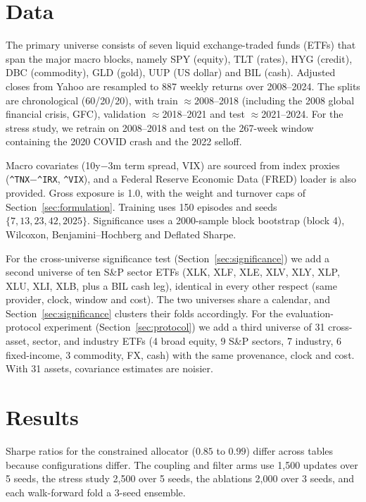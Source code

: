 \documentclass[sigconf]{acmart}
\begin{document}
\section{Data}
\label{sec:data}

The primary universe consists of seven liquid exchange-traded funds (ETFs) that span the major macro blocks, namely SPY (equity), TLT (rates), HYG (credit), DBC (commodity), GLD (gold), UUP
(US dollar) and BIL (cash). Adjusted closes from Yahoo are resampled to 887 weekly returns over
2008--2024. The splits are chronological (60/20/20), with train $\approx$2008--2018 (including the 2008 global financial crisis, GFC), validation $\approx$2018--2021 and test $\approx$2021--2024.
For the stress study, we retrain on 2008--2018 and test on the 267-week window containing the
2020 COVID crash and the 2022 selloff.

Macro covariates (10y$-$3m term spread, VIX) are sourced from index proxies
(\texttt{\^{}TNX$-$\^{}IRX}, \texttt{\^{}VIX}), and a Federal Reserve Economic Data (FRED) loader
is also provided. Gross exposure is 1.0, with the weight and turnover caps of Section~\ref{sec:formulation}. Training uses 150 episodes and seeds $\{7,13,23,42,2025\}$.
Significance uses a 2000-sample block bootstrap (block 4), Wilcoxon, Benjamini--Hochberg and
Deflated Sharpe.

For the cross-universe significance test (Section~\ref{sec:significance}) we add a
second universe of ten S\&P sector ETFs (XLK, XLF, XLE, XLV, XLY, XLP, XLU, XLI, XLB,
plus a BIL cash leg), identical in every other respect (same provider, clock, window
and cost). The two universes share a calendar, and
Section~\ref{sec:significance} clusters their folds accordingly. For the evaluation-protocol
experiment (Section~\ref{sec:protocol}) we add a third universe of 31
cross-asset, sector, and industry ETFs (4 broad equity, 9 S\&P sectors, 7 industry,
6 fixed-income, 3 commodity, FX, cash) with the same provenance, clock and cost. With 31
assets, covariance estimates are noisier.

\section{Results}
\label{sec:results}

Sharpe ratios for the constrained allocator ($0.85$ to $0.99$) differ across tables because configurations differ. The coupling and filter arms use 1,500 updates over 5 seeds, the stress study 2,500 over 5 seeds, the ablations 2,000 over 3 seeds, and each walk-forward fold a 3-seed ensemble.
\end{document}
